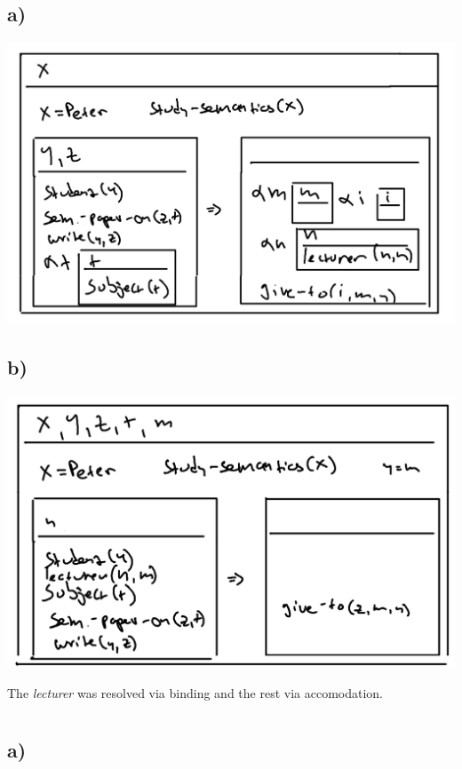 \documentclass{article}
\begin{document}

\section{}

\subsection*{a)}

\includegraphics[width=0.75\linewidth]{drs_a.png}

\subsection*{b)}

\includegraphics[width=0.75\linewidth]{drs_b.png}

The \emph{lecturer} was resolved via binding and the rest via accomodation.

\section{}

\subsection*{a)}
\end{document}
